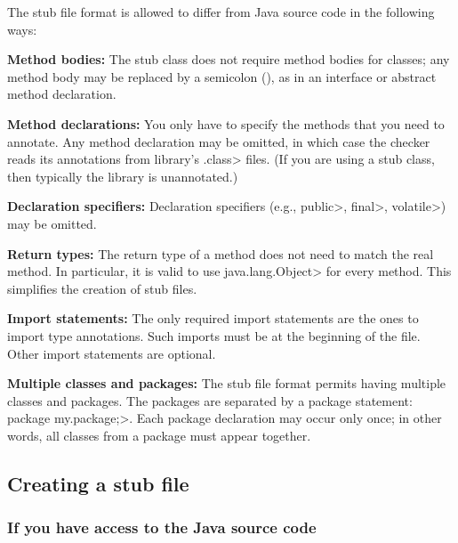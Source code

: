 The stub file format is allowed to differ from Java source code in the
following ways:
\begin{description}

\item{\textbf{Method bodies:}}
  The stub class does not require method bodies for classes; any method
  body may be replaced by a semicolon (\code{;}), as in an interface or
  abstract method declaration.

\item{\textbf{Method declarations:}}
  You only have to specify the methods that you need to annotate.
  Any method declaration may be omitted, in which case the checker reads
  its annotations from library's \<.class> files.  (If you are using a stub class, then
  typically the library is unannotated.)

\item{\textbf{Declaration specifiers:}}
  Declaration specifiers (e.g., \<public>, \<final>, \<volatile>)
  may be omitted.

\item{\textbf{Return types:}}
  The return type of a method does not need to match the real method.
  In particular, it is valid to use \<java.lang.Object> for every method.
  This simplifies the creation of stub files.

\item{\textbf{Import statements:}}
  The only required import statements are the ones to import type
  annotations.  Such imports must be at the beginning of the
  file.  Other import statements are optional.

\item{\textbf{Multiple classes and packages:}}
  The stub file format permits having multiple classes and packages.
  The packages are separated by a package statement:
  \<package my.package;>.  Each package declaration may occur only once; in
  other words, all classes from a package must appear together.

\end{description}


\subsection{Creating a stub file\label{stub-creating}}


\subsubsection{If you have access to the Java source code}

